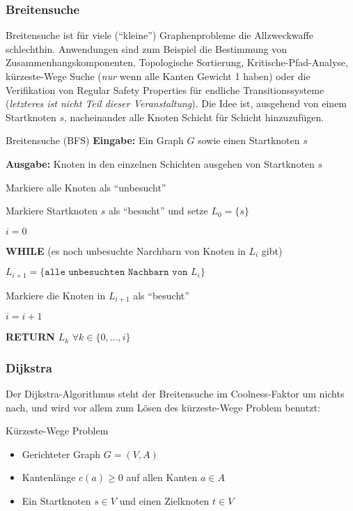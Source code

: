 \documentclass{panikzettel}
\newcommand\tab[1][1cm]{\hspace*{#1}}
\begin{document}
{\subsubsection{Breitensuche}

Breitensuche ist für viele (``kleine'') Graphenprobleme die Allzweckwaffe schlechthin. Anwendungen sind zum Beispiel die Bestimmung von Zusammenhangskomponenten, Topologische Sortierung, Kritische-Pfad-Analyse, kürzeste-Wege Suche (\emph{nur} wenn alle Kanten Gewicht 1 haben) oder die Verifikation von Regular Safety Properties für endliche Transitionssysteme (\textit{letzteres ist nicht Teil dieser Veranstaltung}). Die Idee ist, ausgehend von einem Startknoten $s$, nacheinander alle Knoten Schicht für Schicht hinzuzufügen.

\begin{algo}{Breitensuche (BFS)}
	\textbf{Eingabe:} Ein Graph $G$ sowie einen Startknoten $s$
	
	\textbf{Ausgabe:} Knoten in den einzelnen Schichten ausgehen von Startknoten $s$
	
	\tcblower
	
	Markiere alle Knoten als ``unbesucht''
	
	Markiere Startknoten $s$ als ``besucht'' und setze $L_0 = \{s\}$
	
	$i=0$
	
	\textbf{WHILE} (es noch unbesuchte Narchbarn von Knoten in $L_i$ gibt)
	
	\tab $L_{i+1} = \{\texttt{alle unbesuchten Nachbarn von } L_i \}$
	
	\tab Markiere die Knoten in $L_{i+1}$ als ``besucht''
	
	\tab $i = i+1$
	
	\textbf{RETURN} $L_k$ $\forall k \in \{0, \dots, i\}$
\end{algo}

\subsubsection{Dijkstra}

Der Dijkstra-Algorithmus steht der Breitensuche im Coolness-Faktor um nichts nach, und wird vor allem zum Lösen des kürzeste-Wege Problem benutzt:

\begin{defi}{Kürzeste-Wege Problem}
	\begin{itemize}
		\item Gerichteter Graph $G= (V,A)$
		\item Kantenlänge $c(a)\geq 0$ auf allen Kanten $a \in A$
		\item Ein Startknoten $s \in V$ und einen Zielknoten $t \in V$
	\end{itemize}


\end{defi}}
\end{document}
